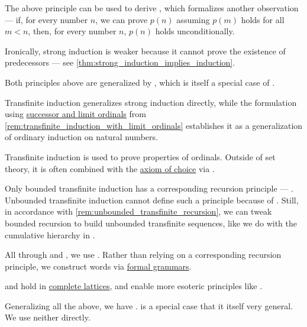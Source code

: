 \begin{concept}
\begin{thmenum}
     The above principle can be used to derive , which formalizes another observation --- if, for every number \( n \), we can prove \( p(n) \) assuming \( p(m) \) holds for all \( m < n \), then, for every number \( n \), \( p(n) \) holds unconditionally.

    Ironically, strong induction is weaker because it cannot prove the existence of predecessors --- see \cref{thm:strong_induction_implies_induction}.

     Both principles above are generalized by , which is itself a special case of .

    Transfinite induction generalizes strong induction directly, while the formulation using \hyperref[def:successor_and_limit_ordinal]{successor and limit ordinals} from \cref{rem:transfinite_induction_with_limit_ordinals} establishes it as a generalization of ordinary induction on natural numbers.

    Transfinite induction is used to prove properties of ordinals. Outside of set theory, it is often combined with the \hyperref[def:zfc/choice]{axiom of choice} via .

    Only bounded transfinite induction has a corresponding recursion principle --- . Unbounded transfinite induction cannot define such a principle because of . Still, in accordance with \cref{rem:unbounded_transfinite_recursion}, we can tweak bounded recursion to build unbounded transfinite sequences, like we do with the cumulative hierarchy in .

     All through  and , we use . Rather than relying on a corresponding recursion principle, we construct words via \hyperref[def:formal_grammar]{formal grammars}.

      and  hold in \hyperref[def:complete_lattice]{complete lattices}, and enable more esoteric principles like .

     Generalizing all the above, we have .  is a special case that it itself very general. We use neither directly.
  \end{thmenum}
\end{concept}

